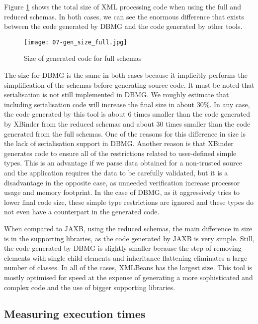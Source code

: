 \documentclass{sig-alternate}
\begin{document}
Figure \ref{fig:codegen_full} shows the total size of XML processing code when using the full and reduced schemas. In both cases, we can see the enormous difference that exists between the code generated by DBMG and the code generated by other tools. 

\begin{figure}
 \begin{center}
\texttt{[image: 07-gen\_size\_full.jpg]}\\
\caption{Size of generated code for full schemas}\label{fig:codegen_full}
\end{center}
\end{figure} 

The size for DBMG is the same in both cases because it implicitly performs the simplification of the schemas before generating source code. It must be noted that serialisation is not still implemented in DBMG. We roughly estimate that including serialisation code will increase the final  size in about 30\%. In any case, the code generated by this tool is about 6 times smaller than the code generated by XBinder from the reduced schemas and about 30 times smaller than the code generated from the full schemas. One of the reasons for this difference in size is the lack of serialisation support in DBMG. Another reason is that XBinder generates code to ensure all of the restrictions related to user-defined simple types. This is an advantage if we parse data obtained for a non-trusted source and the application requires the data to be carefully validated, but it is a disadvantage in the opposite case, as unneeded verification increase processor usage and memory footprint. In the case of DBMG, as it aggressively tries to lower final code size, these simple type restrictions are ignored and these types do not even have a counterpart in the generated code. 

When compared to JAXB, using the reduced schemas, the main difference in size is in the supporting libraries, as the code generated by JAXB is very simple. Still, the code generated by DBMG is slightly smaller because the step of removing elements with single child elements and inheritance flattening eliminates a large number of classes.  In all of the cases, XMLBeans has the largest size. This tool is mostly optimised for speed at the expense of generating a more sophisticated and complex code and the use of bigger supporting libraries.  

\subsection{Measuring execution times}
 
\end{document}

